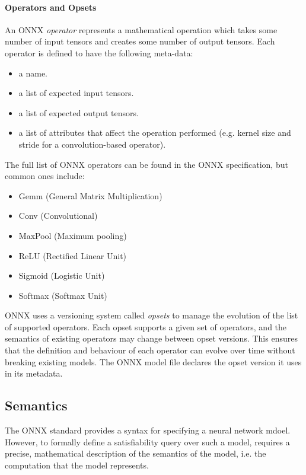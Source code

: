 \paragraph{Operators and Opsets}

An ONNX \emph{operator} represents a mathematical operation which takes some number of input tensors and creates some number of output tensors. Each operator is defined to have the following meta-data: 
\begin{itemize}
	\item a name.
	\item a list of expected input tensors.
	\item a list of expected output tensors.
	\item a list of attributes that affect the operation performed (e.g. kernel size and stride for a convolution-based operator).
\end{itemize}
The full list of ONNX operators can be found in the ONNX specification, but common ones include:
\begin{itemize}
\item Gemm (General Matrix Multiplication)
\item Conv (Convolutional)
\item MaxPool (Maximum pooling)
\item ReLU (Rectified Linear Unit)
\item Sigmoid (Logistic Unit)
\item Softmax (Softmax Unit)
\end{itemize}
ONNX uses a versioning system called \emph{opsets} to manage the evolution of the list of supported operators. Each opset supports a given set of operators, and the semantics of existing operators may change between opset versions.
This ensures that the definition and behaviour of each operator can evolve over time without breaking existing models. The ONNX model file declares the opset version it uses in its metadata.

\subsection{Semantics}
\label{sec:onnx-semantics}

The ONNX standard provides a syntax for specifying a neural network mdoel. However, to formally define a satisfiability query over such a model, requires a precise, mathematical description of the semantics of the model, i.e. the computation that the model represents. 

